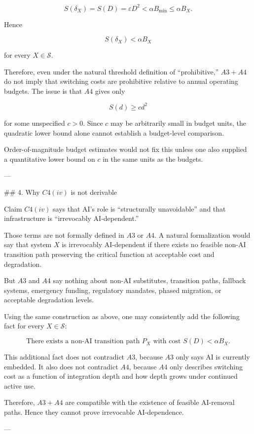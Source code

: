 \[
S(\delta_X)=S(D)=\varepsilon D^2<\alpha B_{\min}\le \alpha B_X.
\]

Hence

\[
S(\delta_X)<\alpha B_X
\]

for every \(X\in\mathcal S\).

Therefore, even under the natural threshold definition of “prohibitive,” \(A3+A4\) do not imply that switching costs are prohibitive relative to annual operating budgets. The issue is that \(A4\) gives only

\[
S(d)\ge c d^2
\]

for some unspecified \(c>0\). Since \(c\) may be arbitrarily small in budget units, the quadratic lower bound alone cannot establish a budget-level comparison.

Order-of-magnitude budget estimates would not fix this unless one also supplied a quantitative lower bound on \(c\) in the same units as the budgets.

---

## 4. Why \(C4(iv)\) is not derivable

Claim \(C4(iv)\) says that AI’s role is “structurally unavoidable” and that infrastructure is “irrevocably AI-dependent.”

Those terms are not formally defined in \(A3\) or \(A4\). A natural formalization would say that system \(X\) is irrevocably AI-dependent if there exists no feasible non-AI transition path preserving the critical function at acceptable cost and degradation.

But \(A3\) and \(A4\) say nothing about non-AI substitutes, transition paths, fallback systems, emergency funding, regulatory mandates, phased migration, or acceptable degradation levels.

Using the same construction as above, one may consistently add the following fact for every \(X\in\mathcal S\):

\[
\text{There exists a non-AI transition path }P_X
\text{ with cost }S(D)<\alpha B_X.
\]

This additional fact does not contradict \(A3\), because \(A3\) only says AI is currently embedded. It also does not contradict \(A4\), because \(A4\) only describes switching cost as a function of integration depth and how depth grows under continued active use.

Therefore, \(A3+A4\) are compatible with the existence of feasible AI-removal paths. Hence they cannot prove irrevocable AI-dependence.

---

